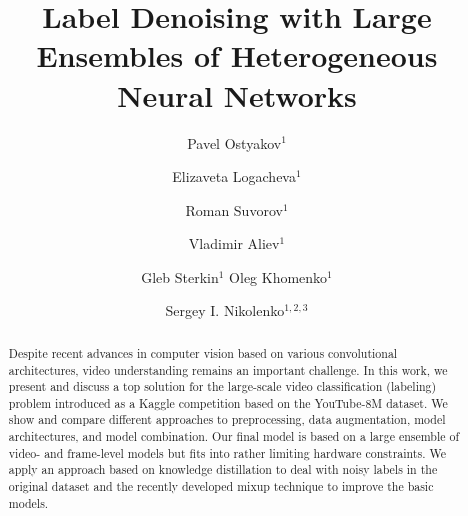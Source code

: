 \documentclass[runningheads]{llncs}
\begin{document}
\pagestyle{headings}
\mainmatter
\def\ECCV18SubNumber{***}  %

\newcommand\gp{\mathrm{GAP}}
\newcommand\gap[1]{\mathrm{GAP@}{#1}}


\title{Label Denoising with Large Ensembles of Heterogeneous Neural Networks} %



\author{Pavel Ostyakov$^1$ \and Elizaveta Logacheva$^1$
	\and Roman Suvorov$^1$ \and Vladimir Aliev$^1$
	\and Gleb Sterkin$^1$
	Oleg Khomenko$^1$
	\and Sergey I. Nikolenko$^{1,2,3}$\\
}

\maketitle

\begin{abstract}
Despite recent advances in computer vision based on various convolutional architectures, video understanding remains an important challenge. In this work, we present and discuss a top solution for the large-scale video classification (labeling) problem introduced as a Kaggle competition based on the YouTube-8M dataset. We show and compare different approaches to preprocessing, data augmentation, model architectures, and model combination. Our final model is based on a large ensemble of video- and frame-level models but fits into rather limiting hardware constraints. We apply an approach based on knowledge distillation to deal with noisy labels in the original dataset and the recently developed mixup technique to improve the basic models.

\end{abstract}
\end{document}
